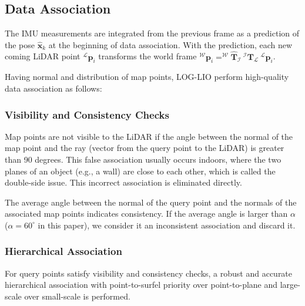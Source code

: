 \documentclass[letterpaper, 10 pt, conference]{ieeeconf}  %
\begin{document}
\subsection{Data Association}
\label{sec:data_association}
The IMU measurements are integrated from the previous frame as a prediction of the pose $\widehat{\mathbf{x}}_{k}$ at the beginning of data association.
With the prediction, each new coming LiDAR point $^\mathcal{L}\boldsymbol{p}_i$ transforms  the world frame $^\mathcal{W}\boldsymbol{p}_i = ^\mathcal{W}\widehat{\boldsymbol{T}}_\mathcal{I}\  ^\mathcal{I}\boldsymbol{T}_\mathcal{L}\  ^\mathcal{L}\boldsymbol{p}_i$.

Having normal and distribution of map points, LOG-LIO perform high-quality data association as follows:
\subsubsection{Visibility and Consistency Checks}
Map points are not visible to the LiDAR if the angle between the normal of the map point and the ray (vector from the query point to the LiDAR) is greater than 90 degrees.
This false association usually occurs indoors, where the two planes of an object (e.g., a wall) are close to each other, which is called the double-side issue\cite{zhou2021lidar}.
This incorrect association is eliminated directly.

The average angle between the normal of the query point and the normals of the associated map points indicates consistency.
If the average angle is larger than $\alpha$ ($\alpha = 60^\circ$ in this paper), we consider it an inconsistent association and discard it.

\subsubsection{Hierarchical Association}
For query points satisfy visibility and consistency checks,
a robust and accurate hierarchical association with point-to-surfel priority over point-to-plane and large-scale over small-scale is performed.
\end{document}

